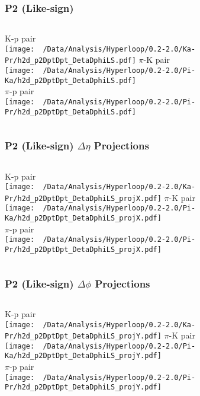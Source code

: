 \documentclass{beamer}
\begin{document}
\begin{frame}
	\frametitle{P2 (Like-sign)}
	\begin{columns}
		\centering
		K-p pair\\
		\texttt{[image: ~/Data/Analysis/Hyperloop/0.2-2.0/Ka-Pr/h2d\_p2DptDpt\_DetaDphiLS.pdf]}
		\centering
		$\pi$-K pair\\
		\texttt{[image: ~/Data/Analysis/Hyperloop/0.2-2.0/Pi-Ka/h2d\_p2DptDpt\_DetaDphiLS.pdf]}\\$\pi$-p pair\\
		\texttt{[image: ~/Data/Analysis/Hyperloop/0.2-2.0/Pi-Pr/h2d\_p2DptDpt\_DetaDphiLS.pdf]}
	\end{columns}
\end{frame}
\begin{frame}
	\frametitle{P2 (Like-sign) $\Delta\eta$ Projections}
	\begin{columns}
		\column{0.5\textwidth}
		\centering
		K-p pair\\
		\texttt{[image: ~/Data/Analysis/Hyperloop/0.2-2.0/Ka-Pr/h2d\_p2DptDpt\_DetaDphiLS\_projX.pdf]}
		\column{0.5\textwidth}
		\centering
		$\pi$-K pair\\
		\texttt{[image: ~/Data/Analysis/Hyperloop/0.2-2.0/Pi-Ka/h2d\_p2DptDpt\_DetaDphiLS\_projX.pdf]}\\$\pi$-p pair\\
		\texttt{[image: ~/Data/Analysis/Hyperloop/0.2-2.0/Pi-Pr/h2d\_p2DptDpt\_DetaDphiLS\_projX.pdf]}
	\end{columns}
\end{frame}
\begin{frame}
	\frametitle{P2 (Like-sign) $\Delta\phi$ Projections}
	\begin{columns}
		\centering
		K-p pair\\
		\texttt{[image: ~/Data/Analysis/Hyperloop/0.2-2.0/Ka-Pr/h2d\_p2DptDpt\_DetaDphiLS\_projY.pdf]}
		\centering
		$\pi$-K pair\\
		\texttt{[image: ~/Data/Analysis/Hyperloop/0.2-2.0/Pi-Ka/h2d\_p2DptDpt\_DetaDphiLS\_projY.pdf]}\\$\pi$-p pair\\
		\texttt{[image: ~/Data/Analysis/Hyperloop/0.2-2.0/Pi-Pr/h2d\_p2DptDpt\_DetaDphiLS\_projY.pdf]}
	\end{columns}
\end{frame}
\end{document}
